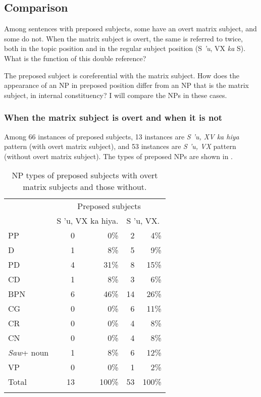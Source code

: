 \documentclass[output=paper
,modfonts
,nonflat]{langsci/langscibook}
\begin{document}
\subsection{\label{s:tsukida:3.3}Comparison}

Among sentences with preposed subjects, some have an overt matrix subject, and some do not. When the matrix subject is overt, the same  is referred to twice, both in the topic position and in the regular subject position (S \textit{'u}, VX \textit{ka} S). What is the function of this double reference? 

The preposed subject is coreferential with the matrix subject. How does the appearance of an NP in preposed position differ from an NP that is the matrix subject, in internal constituency? I will compare the NPs in these cases. 

\subsubsection{\label{s:tsukida:3.3.1}When the matrix subject is overt and when it is not}

Among 66 instances of preposed subjects, 13 instances are \textit{S 'u, XV ka hiya} pattern (with overt matrix  subject), and 53 instances are \textit{S 'u, VX} pattern (without overt matrix subject). The types of preposed NPs are shown in . 

\begin{table}
\begin{tabularx}{\textwidth}{Xrrrr} 
	\lsptoprule
	& \multicolumn{4}{c}{Preposed subjects}\\
	
	& \multicolumn{2}{c}{S 'u, VX ka hiya.} & \multicolumn{2}{l}{S 'u, VX.}\\
	\midrule
	PP &  0 &  0\% &  2 &  4\%\\
	\midrule
	D &  1 &  8\% &  5 &  9\%\\
	PD &  4 &  31\% &  8 &  15\%\\
	CD &  1 &  8\% &  3 &  6\%\\
	BPN &  6 &  46\% &  14 &  26\%\\
	\midrule
	CG &  0 &  0\% &  6 &  11\%\\
	CR &  0 &  0\% &  4 &  8\%\\
	CN &  0 &  0\% &  4 &  8\%\\
	\midrule
	\textit{Saw}+ noun &  1 &  8\% &  6 &  12\%\\
	\midrule
	VP &  0 &  0\% &  1 &  2\%\\
	\midrule
	Total &  13 &  100\% &  53 &  100\%\\
	\lspbottomrule
\end{tabularx}
	\caption{NP types of preposed subjects with overt matrix subjects and those without.} 
	\label{tab:tsukida:4}
\end{table}
\end{document}
